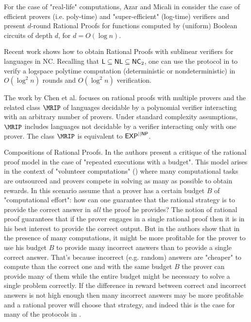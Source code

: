 For the case of "real-life" computations, Azar and Micali in \cite{am1} consider the case of efficient provers (i.e. poly-time) and "super-efficient" (log-time) verifiers and present $d$-round Rational Proofs for functions computed by (uniform) Boolean circuits of depth $d$, for $d=O(\log n)$. 

Recent work \cite{ratsumchecks} shows how to obtain Rational Proofs with sublinear verifiers for languages in NC. Recalling that ${\mathsf{L}} \subseteq {\ensuremath{\mathsf{NL}}} \subseteq {\ensuremath{\mathsf{NC}}}_2$, one can use the protocol  in \cite{ratsumchecks} to verify a logspace polytime computation (deterministic or nondeterministic) in $O(\log^2 n )$ rounds and $O(\log^2 n )$ verification.

The work by Chen et al. \cite{chen2016rational} focuses on rational proofs with multiple provers and the related class $\MRIP$ of languages decidable by a polynomial verifier interacting with an arbitrary number of provers. Under standard complexity assumptions, $\MRIP$ includes languages not decidable by a verifier interacting only with one prover. The class $\MRIP$ is equivalent to ${\mathsf{EXP}}^{||{\mathsf{NP}}}$.


\medskip
\noindent
{\sc Compositions of Rational Proofs.}
In \cite{cg15} the authors present a critique of the rational proof model in the case of "repeated executions with a budget". This model arises in the context of "volunteer computations" (\cite{seti,folding}) where many computational tasks are outsourced and provers compete in solving as many as possible to obtain rewards. In this scenario assume that a prover has a certain budget $B$ of "computational effort": how can one  guarantee that the rational strategy is to provide the correct answer in {\em all} the proof he provides? The notion of rational proof guarantees that if the prover engages in a single rational proof then it is in his best interest to provide the correct output. But in \cite{cg15} the authors show that in the presence of many computations, it might be more profitable for the prover to use his budget $B$ to provide many incorrect answers than to provide a single correct answer. That's because incorrect (e.g. random) answers are "cheaper" to compute than the correct one and with the same budget $B$ the prover can provide many of them while the entire budget might be necessary to solve a single problem correctly. If the difference in reward between correct and incorrect answers is not high enough then many incorrect answers may be more profitable and a rational prover will choose that strategy, and indeed this is the case for many of the protocols in \cite{am,am1,ratargs,ratsumchecks}. 

